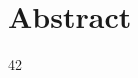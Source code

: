 \documentclass[preamble.tex]{subfiles}
\begin{document}
\clearpage

\chapter*{Abstract}
42
\end{document}
